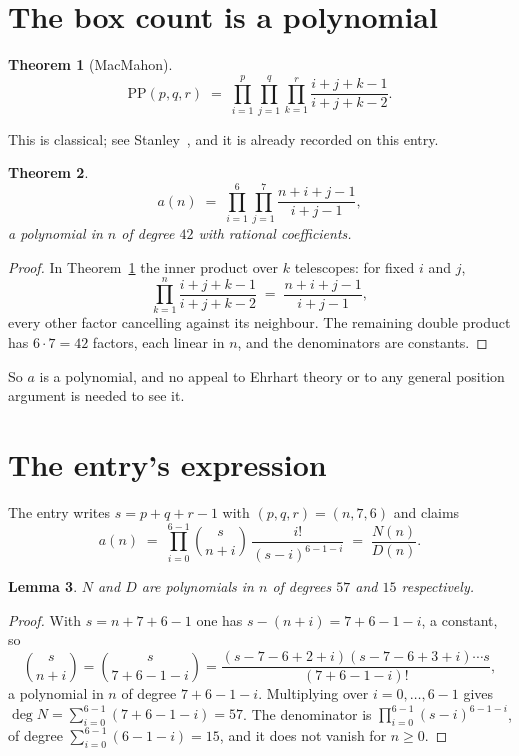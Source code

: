 \documentclass[11pt,a4paper]{article}
\theoremstyle{plain}
\newtheorem{theorem}{Theorem}
\newtheorem{lemma}[theorem]{Lemma}
\theoremstyle{definition}
\begin{document}
\section{The box count is a polynomial}

\begin{theorem}[MacMahon]\label{thm:mm}
\[
\mathrm{PP}(p,q,r)\;=\;\prod_{i=1}^{p}\prod_{j=1}^{q}\prod_{k=1}^{r}
\frac{i+j+k-1}{i+j+k-2} .
\]
\end{theorem}

This is classical; see Stanley~\cite{stanley}, and it is already recorded on this entry.

\begin{theorem}\label{thm:poly}
\[
a(n)\;=\;\prod_{i=1}^{6}\prod_{j=1}^{7}\frac{n+i+j-1}{i+j-1},
\]
a polynomial in $n$ of degree $42$ with rational coefficients.
\end{theorem}

\begin{proof}
In Theorem~\ref{thm:mm} the inner product over $k$ telescopes: for fixed $i$ and $j$,
\[
\prod_{k=1}^{n}\frac{i+j+k-1}{i+j+k-2}\;=\;\frac{n+i+j-1}{i+j-1} ,
\]
every other factor cancelling against its neighbour. The remaining double product has
$6\cdot7=42$ factors, each linear in $n$, and the denominators are constants.
\end{proof}

So $a$ is a polynomial, and no appeal to Ehrhart theory or to any general position argument is
needed to see it.

\section{The entry's expression}

The entry writes $s=p+q+r-1$ with $(p,q,r)=(n,7,6)$ and claims
\[
a(n)\;=\;\prod_{i=0}^{6-1}\binom{s}{n+i}\,\frac{i!}{(s-i)^{6-1-i}}\;=\;
\frac{N(n)}{D(n)} .
\]

\begin{lemma}\label{lem:deg}
$N$ and $D$ are polynomials in $n$ of degrees $57$ and $15$ respectively.
\end{lemma}

\begin{proof}
With $s=n+7+6-1$ one has $s-(n+i)=7+6-1-i$, a constant, so
\[
\binom{s}{n+i}=\binom{s}{7+6-1-i}
=\frac{(s-7-6+2+i)(s-7-6+3+i)\cdots s}{(7+6-1-i)!},
\]
a polynomial in $n$ of degree $7+6-1-i$. Multiplying over $i=0,\dots,6-1$ gives
$\deg N=\sum_{i=0}^{6-1}(7+6-1-i)=57$. The denominator is
$\prod_{i=0}^{6-1}(s-i)^{6-1-i}$, of degree
$\sum_{i=0}^{6-1}(6-1-i)=15$, and it does not vanish for $n\ge0$.
\end{proof}
\end{document}
